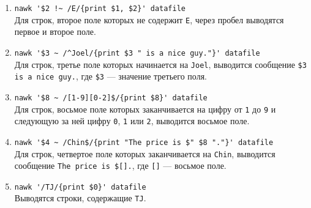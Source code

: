 \documentclass[listings]{labreport}
\begin{document}
\begin{enumerate}
\item \verb|nawk '$2 !~ /E/{print $1, $2}' datafile|\\
Для строк, второе поле которых не содержит \verb|E|, через пробел выводятся первое и второе поле.

\item \verb|nawk '$3 ~ /^Joel/{print $3 " is a nice guy."}' datafile|\\
Для строк, третье поле которых начинается на \verb|Joel|, выводится сообщение \verb|$3 is a nice guy.|, где
\verb|$3| — значение третьего поля.

\item \verb|nawk '$8 ~ /[1-9][0-2]$/{print $8}' datafile|\\
Для строк, восьмое поле которых заканчивается на цифру от \verb|1| до \verb|9| и следующую за ней цифру \verb|0|, \verb|1| или \verb|2|,
выводится восьмое поле.

\item \verb|nawk '$4 ~ /Chin$/{print "The price is $" $8 "."}' datafile|\\
Для строк, четвертое поле которых заканчивается на \verb|Chin|, выводится сообщение \verb|The price is $[].|, где \verb|[]| — восьмое поле.

\item \verb|nawk '/TJ/{print $0}' datafile|\\
Выводятся строки, содержащие \verb|TJ|.

\end{enumerate}
\end{document}
